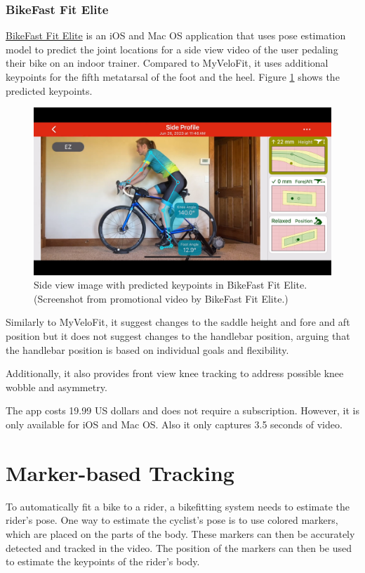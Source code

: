 \subsection{BikeFast Fit Elite}
\href{https://www.bikefastfit.com/}{BikeFast Fit Elite} is an iOS and Mac OS application that uses pose estimation model to predict the joint locations for a side view video of the user pedaling their bike on an indoor trainer. Compared to MyVeloFit, it uses additional keypoints for the fifth metatarsal of the foot and the heel. Figure \ref{fig:bikefastfit_keypoints} shows the predicted keypoints.

\begin{figure}[htbp]
    \centering
    \includegraphics[width=\textwidth]{obrazky-figures/bike_fast_fit_elite.png}
    \caption{Side view image with predicted keypoints in BikeFast Fit Elite. (Screenshot from promotional video \cite{bikeFastFitElitev2Youtube} by BikeFast Fit Elite.)}
    \label{fig:bikefastfit_keypoints}
\end{figure}

Similarly to MyVeloFit, it suggest changes to the saddle height and fore and aft position but it does not suggest changes to the handlebar position, arguing that the handlebar position is based on individual goals and flexibility.

Additionally, it also provides front view knee tracking to address possible knee wobble and asymmetry.

The app costs 19.99 US dollars and does not require a subscription. However, it is only available for iOS and Mac OS. Also it only captures 3.5 seconds of video.


\chapter{Marker-based Tracking}
\label{marker_based_tracking}
To automatically fit a bike to a rider, a bikefitting system needs to estimate the rider's pose. One way to estimate the cyclist's pose is to use colored markers, which are placed on the parts of the body. These markers can then be accurately detected and tracked in the video. The position of the markers can then be used to estimate the keypoints of the rider's body.

